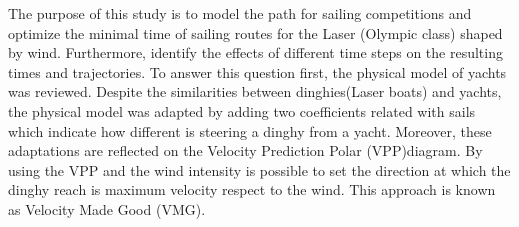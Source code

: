 The purpose of this study is to model the path for sailing competitions and optimize the minimal time of sailing routes for the Laser (Olympic class) shaped by wind. Furthermore, identify the effects of different time steps on the resulting times and trajectories.
To answer this question first, the physical model of yachts was reviewed. Despite the similarities between dinghies(Laser boats) and yachts, the physical model was adapted by adding two coefficients related with sails which indicate%
how different is steering a dinghy from a yacht. Moreover, these adaptations are reflected on the %
Velocity Prediction Polar (VPP)diagram. By using the VPP and the wind intensity is possible to set the direction at which the dinghy reach is maximum velocity respect to the wind. This approach is known as Velocity Made Good (VMG).%

